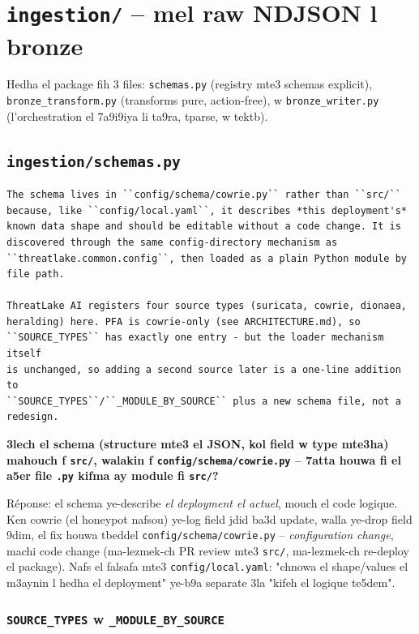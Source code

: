 \documentclass[11pt,a4paper]{report}
\DeclareRobustCommand{\code}[1]{\texttt{#1}}
\DeclareRobustCommand{\file}[1]{\texttt{\color{amber}#1}}
\begin{document}
\chapter{\file{ingestion/} -- mel raw NDJSON l bronze}

Hedha el package fih 3 files: \code{schemas.py} (registry mte3 schemas
explicit), \code{bronze\_transform.py} (transforms pure, action-free), w
\code{bronze\_writer.py} (l'orchestration el 7a9i9iya li ta9ra, tparse, w
tektb).

\section{\file{ingestion/schemas.py}}

\begin{lstlisting}[style=pystyle]
The schema lives in ``config/schema/cowrie.py`` rather than ``src/``
because, like ``config/local.yaml``, it describes *this deployment's*
known data shape and should be editable without a code change. It is
discovered through the same config-directory mechanism as
``threatlake.common.config``, then loaded as a plain Python module by
file path.

ThreatLake AI registers four source types (suricata, cowrie, dionaea,
heralding) here. PFA is cowrie-only (see ARCHITECTURE.md), so
``SOURCE_TYPES`` has exactly one entry - but the loader mechanism itself
is unchanged, so adding a second source later is a one-line addition to
``SOURCE_TYPES``/``_MODULE_BY_SOURCE`` plus a new schema file, not a
redesign.
\end{lstlisting}

\begin{soual}
\textbf{3lech el schema (structure mte3 el JSON, kol field w type mte3ha)
mahouch f \code{src/}, walakin f \code{config/schema/cowrie.py} -- 7atta
houwa fi el a5er file \code{.py} kifma ay module fi \code{src/}?}

Réponse: el schema ye-describe \emph{el deployment el actuel}, mouch el
code logique. Ken cowrie (el honeypot nafsou) ye-log field jdid ba3d
update, walla ye-drop field 9dim, el fix houwa tbeddel \code{config/schema/cowrie.py}
-- \emph{configuration change}, machi code change (ma-lezmek-ch PR review
mte3 \code{src/}, ma-lezmek-ch re-deploy el package). Nafs el falsafa mte3
\code{config/local.yaml}: "chnowa el shape/values el m3aynin l hedha
el deployment" ye-b9a separate 3la "kifeh el logique te5dem".
\end{soual}

\subsection{\code{SOURCE\_TYPES} w \code{\_MODULE\_BY\_SOURCE}}
\end{document}
